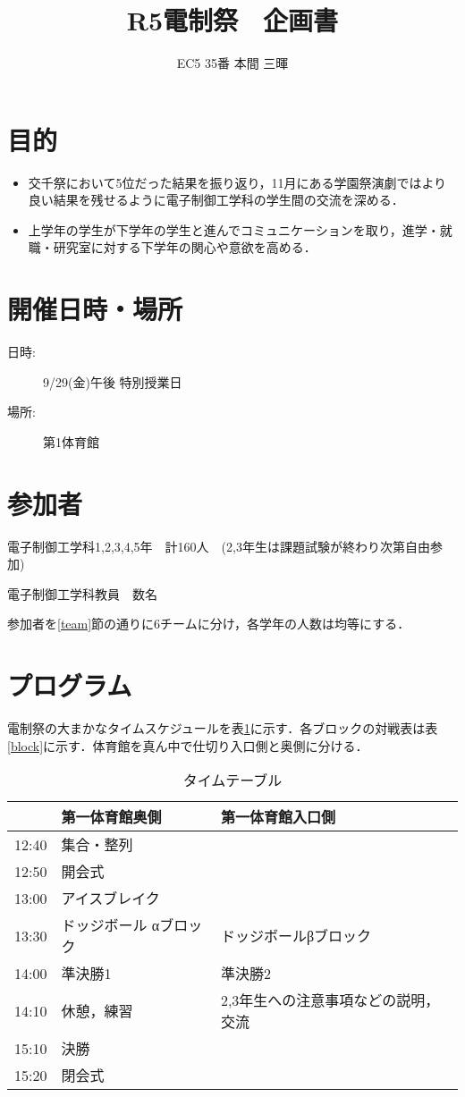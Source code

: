 \documentclass[dvipdfmx]{jsarticle}
\begin{document}
\title{R5電制祭　企画書}
\author{EC5 35番 本間 三暉}
\maketitle

\section{目的}
\begin{itemize}
  \item 交千祭において5位だった結果を振り返り，11月にある学園祭演劇ではより良い結果を残せるように電子制御工学科の学生間の交流を深める．
  \item 上学年の学生が下学年の学生と進んでコミュニケーションを取り，進学・就職・研究室に対する下学年の関心や意欲を高める．
\end{itemize}

\section{開催日時・場所}
\begin{description}
  \item[日時:] 9/29(金)午後 特別授業日
  \item[場所:] 第1体育館
\end{description}
\section{参加者}
電子制御工学科1,2,3,4,5年　計160人　(2,3年生は課題試験が終わり次第自由参加)

電子制御工学科教員　数名


参加者を\ref{team}節の通りに6チームに分け，各学年の人数は均等にする．
\section{プログラム}
電制祭の大まかなタイムスケジュールを表\ref{time}に示す．各ブロックの対戦表は表\ref{block}に示す．体育館を真ん中で仕切り入口側と奥側に分ける．
\begin{table}[H]

  \caption{タイムテーブル}
  \label{time}
  \centering
  \begin{tabular}{l||l|l}
          & 第一体育館奥側      & 第一体育館入口側            \\\hline\hline
    12:40 & 集合・整列        &                     \\
    12:50 & 開会式          &                     \\
    13:00 & アイスブレイク      &                     \\
    13:30 & ドッジボール αブロック & ドッジボールβブロック         \\
    14:00 & 準決勝1         & 準決勝2                \\
    14:10 & 休憩，練習        & 2,3年生への注意事項などの説明，交流 \\
    15:10 & 決勝           &                     \\
    15:20 & 閉会式          &
  \end{tabular}
\end{table}
\end{document}
